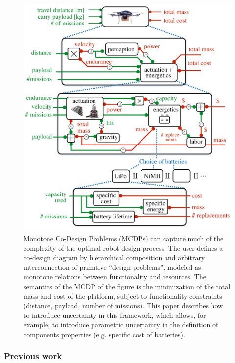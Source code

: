 \documentclass[twocolumn,english]{IEEEconf}
\theoremstyle{plain}
\theoremstyle{definition}
\theoremstyle{definition}
\theoremstyle{plain}
\newcommand{\colR}{\color[rgb]{0.555789,0.000000,0.000000}}
\newcommand{\colF}{\color[rgb]{0.094869,0.500000,0.000000}}
\newcommand{\R}[1]{{\colR #1}}
\newcommand{\F}[1]{{\colF #1}}
\begin{document}
\begin{figure}
\begin{centering}
\includegraphics[scale=0.33]{unc_bigproblem}
\par\end{centering}
\caption{\label{fig:Example1}Monotone Co-Design Problems (MCDPs) can capture
much of the complexity of the optimal robot design process. The user
defines a co-design diagram by hierarchical composition and arbitrary
interconnection of primitive ``design problems'', modeled as monotone
relations between \F{functionality} and \R{resources}. The semantics
of the MCDP of the figure is the minimization of the \R{total mass}
and \R{cost} of the platform, subject to functionality constraints
(\F{distance}, \F{payload}, \F{number of missions}). This paper
describes how to introduce uncertainty in this framework, which allows,
for example, to introduce parametric uncertainty in the definition
of components properties (e.g. specific cost of batteries).}
\end{figure}


\subsubsection*{Previous work}
\end{document}
